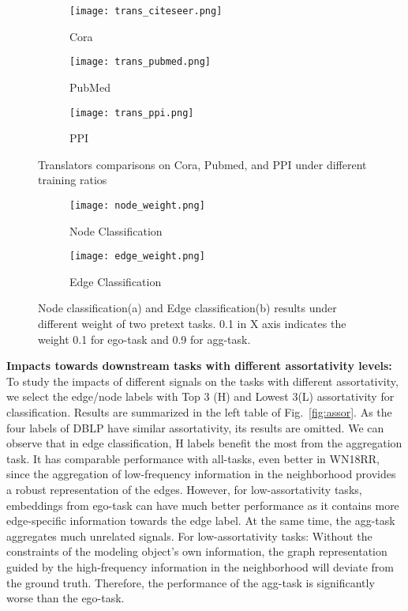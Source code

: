 \documentclass[10pt,journal,compsoc]{IEEEtran}
\begin{document}
\begin{figure*}[ht]
\centering
\begin{subfigure}{0.33\textwidth}
\texttt{[image: trans\_citeseer.png]}
\caption{Cora}
\end{subfigure}
\begin{subfigure}{0.33\textwidth}
\centering
\texttt{[image: trans\_pubmed.png]}
\caption{PubMed}
\end{subfigure}
\begin{subfigure}{0.33\textwidth}
\texttt{[image: trans\_ppi.png]}
\caption{PPI}
\end{subfigure}
\centering
\caption{Translators comparisons on Cora, Pubmed, and PPI under different training ratios}
\label{fig:translator}
\end{figure*}


\begin{figure*}[h]
\centering
\begin{subfigure}{0.49\textwidth}
\centering
 \texttt{[image: node\_weight.png]}
\caption{Node Classification}
\label{fig:ratio_node}
\end{subfigure}
\begin{subfigure}{0.49\textwidth}
\centering
 \texttt{[image: edge\_weight.png]}
\caption{Edge Classification}
\label{fig:ration_edge}
\end{subfigure}

\centering
\caption{Node classification(a) and Edge classification(b) results under different weight of two pretext tasks. 0.1 in X axis indicates the weight 0.1 for ego-task and 0.9 for agg-task.}
\label{fig:weight}
\end{figure*}
\noindent\textbf{Impacts towards downstream tasks with different assortativity levels:} To study the impacts of different signals on the tasks with different assortativity, we select the edge/node labels with Top 3 (H) and Lowest 3(L) assortativity for classification. Results are summarized in the left table of Fig.~\ref{fig:assor}. As the four labels of DBLP have similar assortativity, its results are omitted. We can observe that in edge classification, H labels benefit the most from the aggregation task. It has comparable performance with all-tasks, even better in WN18RR, since the aggregation of low-frequency information in the neighborhood provides a robust representation of the edges. However, for low-assortativity tasks, embeddings from ego-task can have much better performance as it contains more edge-specific information towards the edge label. At the same time, the agg-task aggregates much unrelated signals. For low-assortativity tasks: Without the constraints of the modeling object's own information, the graph representation guided by the high-frequency information in the neighborhood will deviate from the ground truth. Therefore, the performance of the agg-task is significantly worse than the ego-task. 
\end{document}
